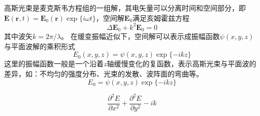 

高斯光束是麦克斯韦方程组的一组解，其电矢量可以分离时间和空间部分，即$\boldsymbol E(\boldsymbol r,t)=\boldsymbol E_0(\boldsymbol r)\exp\{i\omega t\}$，空间解$\boldsymbol E_0$满足亥姆霍兹方程
\begin{equation}
\Delta \boldsymbol E_0 + k^2 \boldsymbol E_0=0
\end{equation}
其中波矢$k=2\pi/\lambda$。
在缓变振幅近似下，空间解可以表示成振幅函数$\psi(x,y,z)$与平面波解的乘积形式
\begin{equation}
E_0(x,y,z) = \psi(x,y,z)\exp\{-ikz\}
\end{equation}
这里的振幅函数一般是一个沿着$z$轴缓慢变化的复函数，表示高斯光束与平面波的差异，如：不均匀的强度分布、光束的发散、波阵面的弯曲等。
\begin{equation}
E_0=\psi(x,y,z)\exp\{-ikz\}
\end{equation}


\begin{equation}
\frac{\partial^2 E}{\partial x^2} +\frac{\partial^2 E}{\partial y^2} -ik 
\end{equation}
